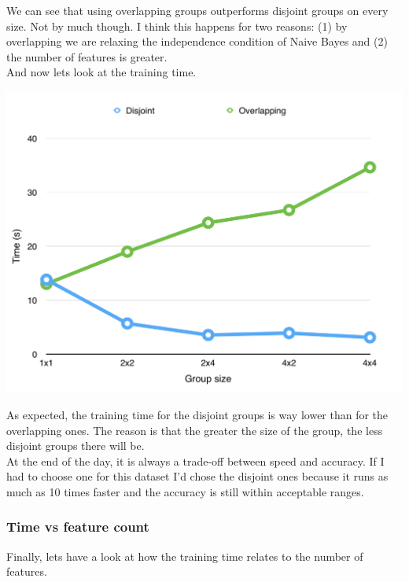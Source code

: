 \documentclass[11pt]{article}
\begin{document}
We can see that using overlapping groups outperforms disjoint groups on every size. Not by much though. I think this happens for two reasons: (1) by overlapping we are relaxing the independence condition of Naive Bayes and (2) the number of features is greater.\\

And now lets look at the training time.
\begin{center}
\includegraphics[scale=0.8]{part1/2/comparison_train.png}
\end{center}

As expected, the training time for the disjoint groups is way lower than for the overlapping ones. The reason is that the greater the size of the group, the less disjoint groups there will be.\\

At the end of the day, it is always a trade-off between speed and accuracy. If I had to choose one for this dataset I'd chose the disjoint ones because it runs as much as 10 times faster and the accuracy is still within acceptable ranges.\\

\subsubsection*{Time vs feature count}
Finally, lets have a look at how the training time relates to the number of features.
\end{document}
